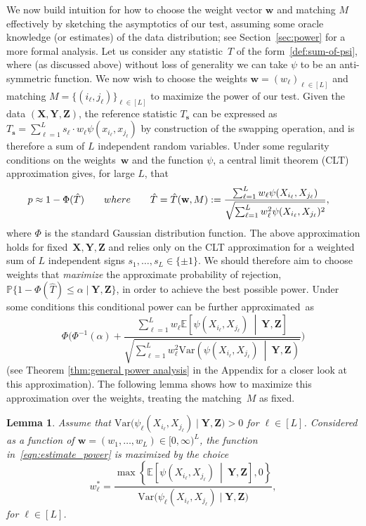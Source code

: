 \documentclass[12pt]{article}
\newtheorem{lemma}[theorem]{Lemma}
\newcommand{\EEst}[2]{\mathbb{E}\left[{#1}\  \middle| \ {#2}\right]}
\newcommand{\VVst}[2]{\mathrm{Var}\left({#1}\  \middle| \ {#2}\right)}
\newcommand{\bs}{\mathbf{s}}
\newcommand{\bX}{\mathbf{X}}
\newcommand{\bY}{\mathbf{Y}}
\newcommand{\bZ}{\mathbf{Z}}
\newcommand{\bw}{\mathbf{w}}
\begin{document}
We now build intuition for how to choose the weight vector $\bw$ and matching $M$ effectively by sketching the asymptotics of our test, assuming some oracle knowledge (or estimates) of the data distribution; see Section~\ref{sec:power} for a more formal analysis.  Let us consider any statistic~$T$ of the form~\eqref{def:sum-of-psi}, where (as discussed above) without loss of generality we can take $\psi$ to be an anti-symmetric function. 
We now wish to choose the weights $\bw = (w_\ell)_{\ell\in [L]}$ and matching $M = \{(i_\ell, j_\ell)\}_{\ell\in [L]}$ to maximize the power of our test. 
Given the data $(\bX, \bY, \bZ)$, the reference statistic $T_\bs$ can be expressed as $T_\bs = \sum_{\ell=1}^L s_\ell \cdot w_\ell\psi(x_{i_\ell},x_{j_\ell})$ by construction of the swapping operation, and is therefore a sum of $L$ independent random variables. 
Under some regularity conditions on the weights~$\bw$ and the function $\psi$, a central limit theorem (CLT) approximation gives, for large $L$, that
\begin{align}\label{eqn:CLT_approx_p_from_sec:oracle}
    p 
    &\approx 1 - \Phi(\hat{T}) 
    \qquad\textnormal{where}\qquad \hat{T} = \hat{T}(\bw,M)
    :=\frac{\sum_{\ell=1}^Lw_\ell\psi(X_{i_\ell},X_{j_\ell})}
    {\sqrt{\sum_{\ell=1}^L w_\ell^2\psi(X_{i_\ell},X_{j_\ell})^2}},
\end{align}
where $\Phi$ is the standard Gaussian distribution function. The above approximation holds for fixed~$\bX,\bY,\bZ$ and relies only on the CLT approximation for a weighted sum of $L$ independent signs $s_1,\dots,s_L\in \{\pm 1\}$.  We should therefore aim to choose weights that \emph{maximize} the approximate probability of rejection, $\mathbb{P}\bigl\{1 - \Phi(\hat{T})\leq \alpha \mid \bY,\bZ\bigr\}$, in order to achieve the best possible power. Under some conditions this conditional power can be further approximated~as
\begin{equation}
\label{eqn:estimate_power}
\Phi\Biggl(\Phi^{-1}(\alpha)+\frac{\sum_{\ell=1}^L w_\ell \EEst{\psi(X_{i_\ell},X_{j_\ell})}{\bY,\bZ}}{\sqrt{\sum_{\ell=1}^L w_\ell^2 \VVst{\psi(X_{i_\ell},X_{j_\ell})}{\bY,\bZ}}}\Biggr)
\end{equation}
(see Theorem \ref{thm:general power analysis} in the Appendix for a closer look at this approximation).
The following lemma shows how to maximize this approximation over the weights, treating the matching~$M$ as fixed.
\begin{lemma}
\label{Lemma:OracleWeights}
Assume that $\mathrm{Var}\bigl(\psi_\ell(X_{i_\ell},X_{j_\ell}) \mid \bY,\bZ\bigr) > 0$ for $\ell \in [L]$. Considered as a function of $\bw = (w_1,\ldots,w_L) \in [0,\infty)^L$, the function in~\eqref{eqn:estimate_power} is maximized by the choice
\begin{equation}\label{eq:oracle-weights}
w^*_\ell =\frac{\max\left\{\EEst{\psi(X_{i_\ell},X_{j_\ell})}{\bY,\bZ},0\right\}}{\mathrm{Var}\bigl(\psi_\ell(X_{i_\ell},X_{j_\ell}) \mid \bY,\bZ\bigr)},
\end{equation}
for $\ell \in [L]$.
\end{lemma}
\end{document}
